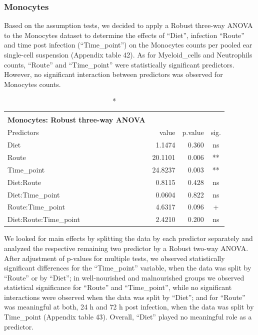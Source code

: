 \documentclass[
  12pt,
  letterpaper,
]{article}
\begin{document}
\subsubsection{Monocytes}\label{monocytes-3}

Based on the assumption tests, we decided to apply a Robust three-way ANOVA to the Monocytes dataset to determine the effects of ``Diet'', infection ``Route'' and time post infection (``Time\_point'') on the Monocytes counts per pooled ear single-cell suspension (Appendix table 42). As for Myeloid\_cells and Neutrophils counts, ``Route'' and ``Time\_point'' were statistically significant predictors. However, no significant interaction between predictors was observed for Monocytes counts.

\begingroup
\fontsize{12.0pt}{14.4pt}\selectfont
\begin{longtable}{l|rrc}
\caption*{
{\large \textbf{Appendix Table 42}} \\ 
{\small \textbf{Monocytes: Robust three-way ANOVA}}
} \\ 
\toprule
Predictors & {value} & {p.value} & {sig.} \\ 
\midrule\addlinespace[2.5pt]
Diet & 1.1474 & 0.360 & ns \\ 
Route & 20.1101 & 0.006 & ** \\ 
Time\_point & 24.8237 & 0.003 & ** \\ 
Diet:Route & 0.8115 & 0.428 & ns \\ 
Diet:Time\_point & 0.0604 & 0.822 & ns \\ 
Route:Time\_point & 4.6317 & 0.096 & + \\ 
Diet:Route:Time\_point & 2.4210 & 0.200 & ns \\ 
\bottomrule
\end{longtable}
\endgroup

We looked for main effects by splitting the data by each predictor separately and analyzed the respective remaining two predictor by a Robust two-way ANOVA. After adjustment of p-values for multiple tests, we observed statistically significant differences for the ``Time\_point'' variable, when the data was split by ``Route'' or by ``Diet''; in well-nourished and malnourished groups we observed statistical significance for ``Route'' and ``Time\_point'', while no significant interactions were observed when the data was split by ``Diet''; and for ``Route'' was meaningful at both, 24 h and 72 h post infection, when the data was split by Time\_point (Appendix table 43). Overall, ``Diet'' played no meaningful role as a predictor.
\end{document}
